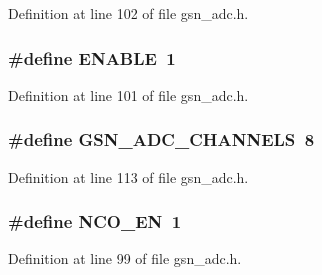 Definition at line 102 of file gsn\_\-adc.h.

\hypertarget{a00474_a514ad415fb6125ba296793df7d1a468a}{
\subsubsection[{ENABLE}]{\setlength{\rightskip}{0pt plus 5cm}\#define ENABLE~1}}
\label{a00474_a514ad415fb6125ba296793df7d1a468a}


Definition at line 101 of file gsn\_\-adc.h.

\hypertarget{a00474_afc1cf9ba2cb95df9f7de39a82bbf512f}{
\subsubsection[{GSN\_\-ADC\_\-CHANNELS}]{\setlength{\rightskip}{0pt plus 5cm}\#define GSN\_\-ADC\_\-CHANNELS~8}}
\label{a00474_afc1cf9ba2cb95df9f7de39a82bbf512f}


Definition at line 113 of file gsn\_\-adc.h.

\hypertarget{a00474_ab8fd0009fa6d35ff704fc41da883e0af}{
\subsubsection[{NCO\_\-EN}]{\setlength{\rightskip}{0pt plus 5cm}\#define NCO\_\-EN~1}}
\label{a00474_ab8fd0009fa6d35ff704fc41da883e0af}


Definition at line 99 of file gsn\_\-adc.h.

